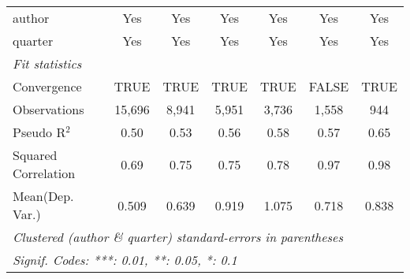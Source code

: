 \begin{tabular}{lcccccc}
   author                                                     & Yes           & Yes           & Yes          & Yes           & Yes          & Yes\\  
   quarter                                                    & Yes           & Yes           & Yes          & Yes           & Yes          & Yes\\  
   \midrule
   \emph{Fit statistics}\\
   Convergence                                                &TRUE           & TRUE          & TRUE         & TRUE          & FALSE        & TRUE\\  
   Observations                                               & 15,696        & 8,941         & 5,951        & 3,736         & 1,558        & 944\\  
   Pseudo R$^2$                                               & 0.50          & 0.53          & 0.56         & 0.58          & 0.57         & 0.65\\  
   Squared Correlation                                        & 0.69          & 0.75          & 0.75         & 0.78          & 0.97         & 0.98\\  
Mean(Dep. Var.) & 0.509 & 0.639 & 0.919 & 1.075 & 0.718 & 0.838 \\
   \midrule \midrule
   \multicolumn{7}{l}{\emph{Clustered (author \& quarter) standard-errors in parentheses}}\\
   \multicolumn{7}{l}{\emph{Signif. Codes: ***: 0.01, **: 0.05, *: 0.1}}\\
\end{tabular}
\par\endgroup
